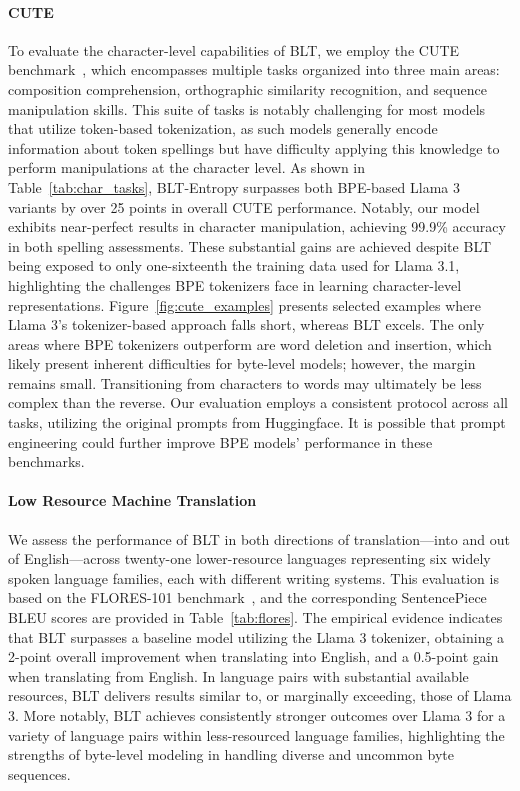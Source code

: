 \paragraph{CUTE}
To evaluate the character-level capabilities of {\textsc BLT}, we employ the CUTE benchmark~\citep{edman2024cute}, which encompasses multiple tasks organized into three main areas: composition comprehension, orthographic similarity recognition, and sequence manipulation skills. This suite of tasks is notably challenging for most models that utilize token-based tokenization, as such models generally encode information about token spellings but have difficulty applying this knowledge to perform manipulations at the character level. As shown in Table~\ref{tab:char_tasks}, {\textsc BLT}-Entropy surpasses both BPE-based Llama 3 variants by over 25 points in overall CUTE performance. Notably, our model exhibits near-perfect results in character manipulation, achieving 99.9\% accuracy in both spelling assessments. These substantial gains are achieved despite {\textsc BLT} being exposed to only one-sixteenth the training data used for Llama 3.1, highlighting the challenges BPE tokenizers face in learning character-level representations. Figure~\ref{fig:cute_examples} presents selected examples where Llama 3's tokenizer-based approach falls short, whereas {\textsc BLT} excels. The only areas where BPE tokenizers outperform are word deletion and insertion, which likely present inherent difficulties for byte-level models; however, the margin remains small. Transitioning from characters to words may ultimately be less complex than the reverse. Our evaluation employs a consistent protocol across all tasks, utilizing the original prompts from Huggingface. It is possible that prompt engineering could further improve BPE models' performance in these benchmarks.

\paragraph{Low Resource Machine Translation} We assess the performance of {\textsc BLT} in both directions of translation—into and out of English—across twenty-one lower-resource languages representing six widely spoken language families, each with different writing systems. This evaluation is based on the FLORES-101 benchmark~\citep{goyal2022flores}, and the corresponding SentencePiece BLEU scores are provided in Table~\ref{tab:flores}. The empirical evidence indicates that {\textsc BLT} surpasses a baseline model utilizing the Llama 3 tokenizer, obtaining a 2-point overall improvement when translating into English, and a 0.5-point gain when translating from English. In language pairs with substantial available resources, {\textsc BLT} delivers results similar to, or marginally exceeding, those of Llama 3. More notably, {\textsc BLT} achieves consistently stronger outcomes over Llama 3 for a variety of language pairs within less-resourced language families, highlighting the strengths of byte-level modeling in handling diverse and uncommon byte sequences.

